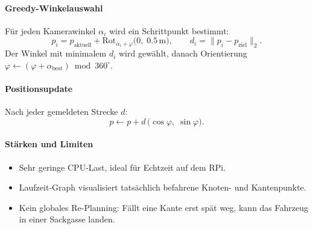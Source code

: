 \documentclass[main.tex]{subfiles} %
\begin{document}
\paragraph{Greedy-Winkelauswahl}
Für jeden Kamerawinkel $\alpha_i$ wird ein Schrittpunkt bestimmt:
\[
  p_i = p_{\text{aktuell}} +
  \mathrm{Rot}_{\alpha_i+\varphi}\!\bigl(0,\;0.5\,\mathrm{m}\bigr),
  \qquad
  d_i = \lVert p_i - p_{\text{ziel}}\rVert_2.
\]
Der Winkel mit minimalem $d_i$ wird gewählt,
danach Orientierung
$\varphi \leftarrow (\varphi + \alpha_{\text{best}}) \bmod 360^{\circ}$.

\paragraph{Positionsupdate}
Nach jeder gemeldeten Strecke $d$:
\[
  p \leftarrow p + d\,
  \bigl(\cos\varphi,\;\sin\varphi\bigr).
\]

\paragraph{Stärken und Limiten}
\vspace{-0.3\baselineskip}
\begin{itemize}
  \item Sehr geringe CPU-Last, ideal für Echtzeit auf dem RPi.
  \item Laufzeit-Graph visualisiert tatsächlich befahrene Knoten- und
    Kantenpunkte.
  \item Kein globales Re-Planning: Fällt eine Kante erst spät weg,
    kann das Fahrzeug in einer Sackgasse landen.
\end{itemize}
\end{document}
